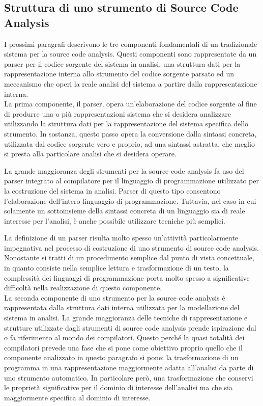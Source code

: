 \subsection{Struttura di uno strumento di Source Code Analysis}

I prossimi paragrafi descrivono le tre componenti fondamentali di un
tradizionale sistema per la source code analysis. Questi componenti sono
rappresentate da un parser per il codice sorgente del sistema in analisi, una
struttura dati per la rappresentazione interna allo strumento del codice
sorgente parsato ed un meccanismo che operi la reale analisi del sistema a
partire dalla rappresentazione interna.\\

La prima componente, il parser, opera un'elaborazione del codice sorgente al
fine di produrre una o più rappresentazioni sistema che si desidera analizzare
utilizzando la struttura dati per la rappresentazione del sistema specifica
dello strumento. In sostanza, questo passo opera la conversione dalla sintassi
concreta, utilizzata dal codice sorgente vero e proprio, ad una sintassi
astratta, che meglio si presta alla particolare analisi che si desidera
operare.

La grande maggioranza degli strumenti per la source code analysis fa uso del
parser integrato al compilatore per il linguaggio di programmazione utilizzato
per la costruzione del sistema in analisi. Parser di questo tipo consentono
l’elaborazione dell’intero linguaggio di programmazione. Tuttavia, nel caso in
cui solamente un sottoinsieme della sintassi concreta di un linguaggio sia di
reale interesse per l’analisi, è anche possibile utilizzare tecniche più
semplici.

La definizione di un parser risulta molto spesso un'attività particolarmente
impegnativa nel processo di costruzione di uno strumento di source code
analysis. Nonostante si tratti di un procedimento semplice dal punto di vista
concettuale, in quanto consiste nella semplice lettura e trasformazione di un
testo, la complessità dei linguaggi di programmazione porta molto spesso a
significative difficoltà nella realizzazione di questo componente.\\

La seconda componente di uno strumento per la source code analysis è
rappresentata dalla struttura dati interna utilizzata per la modellazione del
sistema in analisi. La grande maggioranza delle tecniche di rappresentazione e
strutture utilizzate dagli strumenti di source code analysis prende ispirazione
dal o fa riferimento al mondo dei compilatori. Questo perché la quasi totalità
dei compilatori prevede una fase che si pone come obiettivo proprio quello che
il componente analizzato in questo paragrafo si pone: la trasformazione di un
programma in una rappresentazione maggiormente adatta all’analisi da parte di
uno strumento automatico. In particolare però, una trasformazione che conservi
le proprietà significative per il dominio di interesse dell'analisi ma che sia
maggiormente specifica al dominio di interesse.

